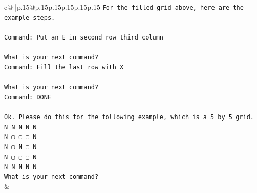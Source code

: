 \documentclass{article}
\begin{document}
{\begin{supertabular}{c@{$\;$}|p{.15\linewidth}@{}p{.15\linewidth}p{.15\linewidth}p{.15\linewidth}p{.15\linewidth}p{.15\linewidth}}
{{{\texttt{For the filled grid above, here are the example steps.} \\
\\ 
\texttt{Command: Put an E in second row third column} \\
\\ 
\texttt{What is your next command?} \\
\texttt{Command: Fill the last row with X} \\
\\ 
\texttt{What is your next command?} \\
\texttt{Command: DONE} \\
\\ 
\texttt{Ok. Please do this for the following example, which is a 5 by 5 grid.} \\
\texttt{N N N N N} \\
\texttt{N ▢ ▢ ▢ N} \\
\texttt{N ▢ N ▢ N} \\
\texttt{N ▢ ▢ ▢ N} \\
\texttt{N N N N N} \\
\texttt{What is your next command?} \\
            }
        }
    }
    & \\ \\


\end{supertabular}}
\end{document}
